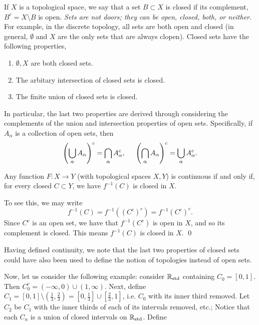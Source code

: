 \noindent If $X$ is a topological space, we say that a set $B \subset X$ is closed if its complement, $B^c = X \setminus B$ is open. \textit{Sets are not doors; they can be open, closed, both, or neither.} For example, in the discrete topology, all sets are both open and closed (in general, $\emptyset$ and $X$ are the only sets that are always clopen).
\medskip\newline
Closed sets have the following properties,
\begin{enumerate}[label=(\alph*)]
    \item $\emptyset, X$ are both closed sets.
    \item The arbitary intersection of closed sets is closed.
    \item The finite union of closed sets is closed.
\end{enumerate}
In particular, the last two properties are derived through considering the complements of the union and intersection properties of open sets. Specifically, if $A_\alpha$ is a collection of open sets, then
\[ \left(\bigcup_{\alpha} A_\alpha\right)^c = \bigcap_{\alpha} A_\alpha^c, \hspace{0.2in} \left(\bigcap_{\alpha} A_\alpha \right)^c = \bigcup_\alpha A_\alpha^c. \]
\begin{simplethm}
    Any function $F : X \to Y$ (with topological spaces $X, Y$) is continuous if and only if, for every closed $C \subset Y$, we have $f^{-1}(C)$ is closed in $X$.
\end{simplethm}
\noindent To see this, we may write
\[ f^{-1}(C) = f^{-1}((C^c)^c) = f^{-1}(C^c)^c. \]
Since $C^c$ is an open set, we have that $f^{-1}(C^c)$ is open in $X$, and so its complement is closed. This means $f^{-1}(C)$ is closed in $X$. \qed
\begin{remark}
    Having defined continuity, we note that the last two properties of closed sets could have also been used to define the notion of topologies instead of open sets.
\end{remark}
\noindent Now, let us consider the following example: consider $\mathbb R_\mathrm{std}$ containing $C_0 = [0, 1]$. Then $C_0^c = (-\infty, 0) \cup (1, \infty)$. Next, define $C_1 = [0, 1] \setminus (\frac{1}{3}, \frac{2}{3}) = [0, \frac{1}{3}] \cup [\frac{2}{3}, 1]$, i.e. $C_0$ with its inner third removed. Let $C_2$ be $C_1$ with the inner thirds of each of its intervals removed, etc.;
\medskip\newline
\noindent Notice that each $C_n$ is a union of closed intervals on $\mathbb R_\mathrm{std}$. Define
